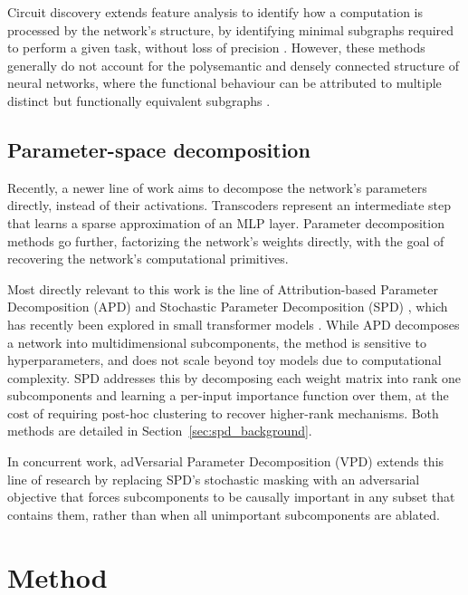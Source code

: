 \documentclass{article}
\begin{document}
Circuit discovery extends feature analysis to identify
how a computation is processed by the network's structure,
by identifying  minimal subgraphs required to perform a given task,
without loss of precision \autocite{olah2020zoomin,marks2025sparsefeaturecircuitsdiscovering}.
However, these methods generally do not account for the
polysemantic and densely connected structure of neural networks,
where the functional behaviour can be attributed to multiple distinct but functionally equivalent subgraphs \autocite{méloux2025everythingeverywhereoncemechanistic}.

\subsection{Parameter-space decomposition}

Recently, a newer line of work aims to decompose the network's parameters directly, instead of their activations.
Transcoders \autocite{dunefsky2024transcodersinterpretablellmfeature} represent an intermediate step that learns a sparse approximation of an MLP layer. Parameter decomposition methods go further, factorizing the network's weights directly, with the goal of recovering the network's computational primitives.

Most directly relevant to this work is the
line of Attribution-based Parameter Decomposition (APD)
\autocite{AttributionBasedParameterDecomposition} and
Stochastic Parameter Decomposition (SPD)
\autocite{stochasticparameterdecomposition}, which has
recently been explored in small transformer models
\autocite{christensen2025decompositionsmalltransformermodels}.
While APD decomposes a network into multidimensional
subcomponents,
the method is sensitive to hyperparameters, and does not scale beyond toy models
due to computational complexity. SPD addresses this
by decomposing each weight matrix into rank one
subcomponents and learning a per-input importance
function over them, at the cost of requiring post-hoc
clustering to recover higher-rank mechanisms. 
Both methods are detailed in
Section~\ref{sec:spd_background}.

In concurrent work, adVersarial Parameter Decomposition (VPD)
\autocite{bushnaq2026interpreting_new_spd} extends this line of
research by replacing SPD's stochastic masking with an adversarial
objective that forces subcomponents to be 
causally important in any subset that contains
them, rather than when all unimportant subcomponents are ablated.

\section{Method}
\end{document}
